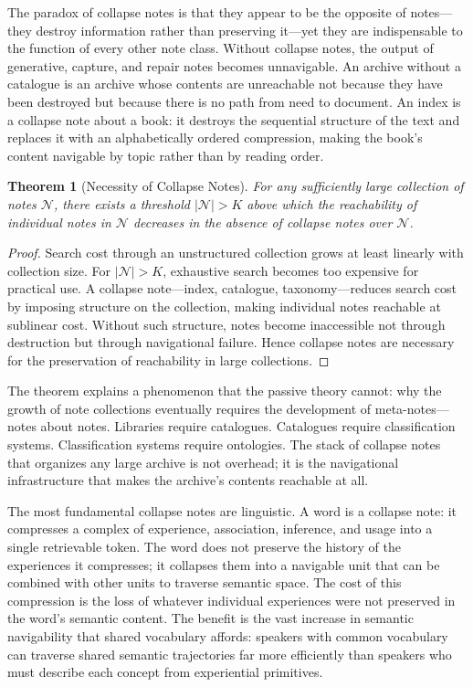 \documentclass[12pt, a4paper]{article}
\theoremstyle{plain}
\newtheorem{theorem}{Theorem}[section]
\theoremstyle{definition}
\theoremstyle{remark}
\begin{document}
The paradox of collapse notes is that they appear to be the opposite of notes---
they destroy information rather than preserving it---yet they are indispensable to
the function of every other note class. Without collapse notes, the output of
generative, capture, and repair notes becomes unnavigable. An archive without a
catalogue is an archive whose contents are unreachable not because they have been
destroyed but because there is no path from need to document. An index is a
collapse note about a book: it destroys the sequential structure of the text and
replaces it with an alphabetically ordered compression, making the book's content
navigable by topic rather than by reading order.

\begin{theorem}[Necessity of Collapse Notes]
For any sufficiently large collection of notes $\mathcal{N}$, there exists a
threshold $|\mathcal{N}| > K$ above which the reachability of individual notes
in $\mathcal{N}$ decreases in the absence of collapse notes over $\mathcal{N}$.
\end{theorem}

\begin{proof}
Search cost through an unstructured collection grows at least linearly with
collection size. For $|\mathcal{N}| > K$, exhaustive search becomes too expensive
for practical use. A collapse note---index, catalogue, taxonomy---reduces search
cost by imposing structure on the collection, making individual notes reachable
at sublinear cost. Without such structure, notes become inaccessible not through
destruction but through navigational failure. Hence collapse notes are necessary
for the preservation of reachability in large collections.
\end{proof}

The theorem explains a phenomenon that the passive theory cannot: why the growth
of note collections eventually requires the development of meta-notes---notes about
notes. Libraries require catalogues. Catalogues require classification systems.
Classification systems require ontologies. The stack of collapse notes that
organizes any large archive is not overhead; it is the navigational infrastructure
that makes the archive's contents reachable at all.

The most fundamental collapse notes are linguistic. A word is a collapse note: it
compresses a complex of experience, association, inference, and usage into a
single retrievable token. The word does not preserve the history of the experiences
it compresses; it collapses them into a navigable unit that can be combined with
other units to traverse semantic space. The cost of this compression is the loss
of whatever individual experiences were not preserved in the word's semantic
content. The benefit is the vast increase in semantic navigability that shared
vocabulary affords: speakers with common vocabulary can traverse shared semantic
trajectories far more efficiently than speakers who must describe each concept
from experiential primitives.
\end{document}
